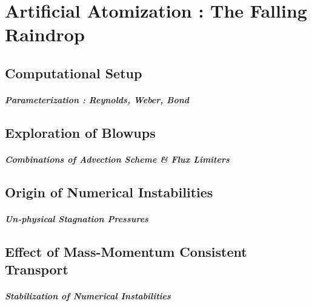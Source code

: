 \setchapterpreamble[u]{\margintoc}
\chapter{Artificial Atomization : The Falling Raindrop}


\section{Computational Setup}

\paragraph{Parameterization : Reynolds, Weber, Bond}
\blindtext


\section{Exploration of Blowups}

\paragraph{Combinations of Advection Scheme \& Flux Limiters}
\blindtext


\section{Origin of Numerical Instabilities}

\paragraph{Un-physical Stagnation Pressures}
\blindtext


\section{Effect of Mass-Momentum Consistent Transport}

\paragraph{Stabilization of Numerical Instabilities}
\blindtext


